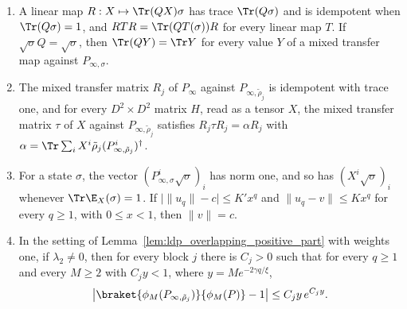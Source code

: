 \begin{lemma}
\begin{enumerate}
              $\tilde\rho_j=E_j\rho_jE_j^\dagger$ is a fixed point of $\E_A$.
        \item A linear map $R:X\mapsto\Tr(QX)\sigma$ has trace $\Tr(Q\sigma)$ and is
              idempotent when $\Tr(Q\sigma)=1$, and $RTR=\Tr(QT(\sigma))R$ for every linear
              map $T$. If $\sqrt\sigma Q=\sqrt\sigma$, then
              $\Tr(QY)=\Tr Y$ for every value $Y$ of a mixed transfer map against
              $P_{\infty,\sigma}$.
        \item The mixed transfer matrix $R_j$ of $P_\infty$ against $P_{\infty,\tilde\rho_j}$ is
              idempotent with trace one, and for every $D^2\times D^2$ matrix $H$, read as a
              tensor $X$, the mixed transfer matrix $\tau$ of $X$ against
              $P_{\infty,\tilde\rho_j}$ satisfies $R_j\tau R_j=\alpha R_j$ with
              $\alpha=\Tr\sum_iX^i\tilde\rho_j(P_{\infty,\tilde\rho_j}^i)^\dagger$.
        \item For a state $\sigma$, the vector $(P_{\infty,\sigma}^i\sqrt\sigma)_i$ has norm one,
              and so has $(X^i\sqrt\sigma)_i$ whenever $\Tr\E_X(\sigma)=1$. If
              $\lvert\lVert u_q\rVert-c\rvert\le K'x^q$ and
              $\lVert u_q-v\rVert\le Kx^q$ for every $q\ge1$, with $0\le x<1$, then
              $\lVert v\rVert=c$.
        \item In the setting of Lemma~\ref{lem:ldp_overlapping_positive_part} with weights
              one, if $\lambda_2\neq0$, then for every block $j$ there is $C_j>0$ such that for every $q\ge1$ and
              every $M\ge2$ with $C_jy<1$, where $y=Me^{-2\gamma q/\xi}$,
              \begin{align*}
                  \bigl\lvert\braket{\phi_M(P_{\infty,\tilde\rho_j})}{\phi_M(P)}-1\bigr\rvert
                  \le C_jy\,e^{C_jy}.
              \end{align*}
    \end{enumerate}
\end{lemma}
